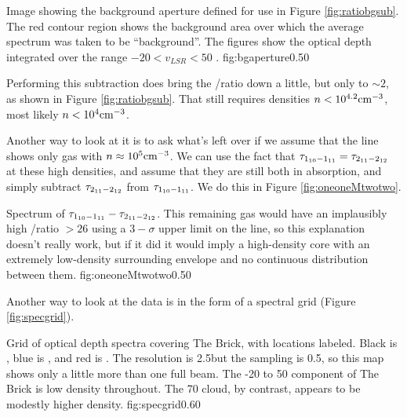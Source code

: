 {Image showing the background aperture defined for use in Figure \ref{fig:ratiobgsub}.  The red contour region
shows the background area over which the average spectrum was taken to be ``background''.  
The \formaldehyde figures show the optical depth integrated over the range $-20 < v_{LSR} < 50$ \kms.}
{fig:bgaperture}{0.5}{0}

Performing this subtraction does bring the \oneone/\twotwo ratio down a little,
but only to $\sim2$, as shown in Figure \ref{fig:ratiobgsub}.  That still
requires densities $n<10^{4.2} \textrm{cm}^{-3}$, most likely $n<10^4 \textrm{cm}^{-3}$.

Another way to look at it is to ask what's left over if we assume that the \twotwo line shows
only gas with $n\approx10^5\textrm{cm}^{-3}$.  We can use the fact that $\tau_{1_{10}-1_{11}} = \tau_{2_{11}-2_{12}}$ 
at these high densities, and assume that they are still both in absorption, and simply subtract
$\tau_{2_{11}-2_{12}}$ from $\tau_{1_{10}-1_{11}}$.  We do this in Figure \ref{fig:oneoneMtwotwo}.

{Spectrum of $\tau_{1_{10}-1_{11}} - \tau_{2_{11}-2_{12}}$.  This remaining gas would have an implausibly
high \oneone/\twotwo ratio $ > 26$ using a $3-\sigma$ upper limit on the \twotwo line, so 
this explanation doesn't really work, but if it did it would imply a high-density core with an extremely low-density
surrounding envelope and no continuous distribution between them.}
{fig:oneoneMtwotwo}{0.5}{0}

Another way to look at the data is in the form of a spectral grid (Figure \ref{fig:specgrid}).


{Grid of optical depth spectra covering The Brick, with locations labeled.
Black is \formaldehyde \oneone, blue is \formaldehydeIso \oneone, and red is
\formaldehyde \twotwo.  The resolution is 2.5\arcmin but the sampling is
0.5\armcin, so this map shows only a little more than one full beam.  The -20
to 50 \kms component of The Brick is low density throughout.  The 70 \kms
cloud, by contrast, appears to be modestly higher density.}
{fig:specgrid}{0.6}{0}




